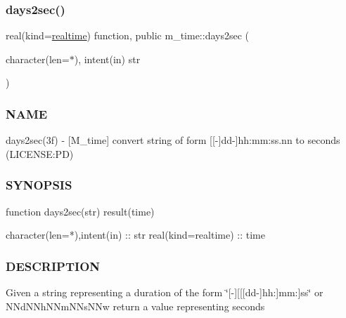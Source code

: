 \subsubsection{\texorpdfstring{days2sec()}{days2sec()}}
{\footnotesize\ttfamily real(kind=\mbox{\hyperlink{namespacem__time_ac10ea9e8d59ec74eaa7d89f2517d7422}{realtime}}) function, public m\+\_\+time\+::days2sec (\begin{DoxyParamCaption}\item[{character(len=$\ast$), intent(in)}]{str }\end{DoxyParamCaption})}



\subsubsection*{N\+A\+ME}

days2sec(3f) -\/ \mbox{[}M\+\_\+time\mbox{]} convert string of form \mbox{[}\mbox{[}-\/\mbox{]}dd-\/\mbox{]}hh\+:mm\+:ss.\+nn to seconds (L\+I\+C\+E\+N\+SE\+:PD) 

\subsubsection*{S\+Y\+N\+O\+P\+S\+IS}

\begin{DoxyVerb}function days2sec(str) result(time)

 character(len=*),intent(in)       :: str
 real(kind=realtime)               :: time
\end{DoxyVerb}


\subsubsection*{D\+E\+S\+C\+R\+I\+P\+T\+I\+ON}

Given a string representing a duration of the form \char`\"{}\mbox{[}-\/\mbox{]}\mbox{[}\mbox{[}\mbox{[}dd-\/\mbox{]}hh\+:\mbox{]}mm\+:\mbox{]}ss\char`\"{} or N\+Nd\+N\+Nh\+N\+Nm\+N\+Ns\+N\+Nw return a value representing seconds

